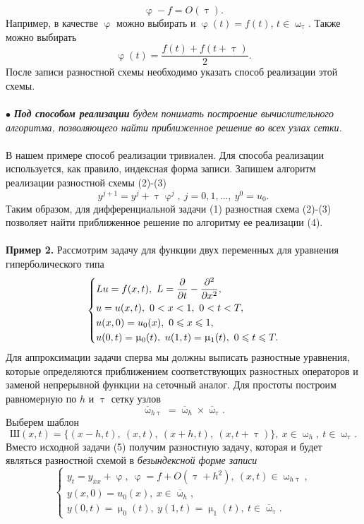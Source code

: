 \documentclass[a4paper, 12pt]{report}
\numberwithin{equation}{section}
\newcommand{\ol}{\overline}
\renewcommand{\leq}{\leqslant}
\renewcommand{\varphi}{\upvarphi}
\renewcommand{\tau}{\uptau}
\renewcommand{\mu}{\upmu}
\renewcommand{\omega}{\upomega}
\renewcommand{\d}{\partial}
\begin{document}
$$\varphi - f = O(\tau).$$
Например, в качестве $\varphi$ можно выбирать и $\varphi(t) = f(t)$, $t \in \omega_{\tau}$. Также можно выбирать $$\varphi(t) = \dfrac{f(t) + f(t+\tau)}{2}.$$
После записи разностной схемы необходимо указать способ реализации этой схемы.\\\\ $\bullet$ \textit{\textbf{Под способом реализации} будем понимать построение вычислительного алгоритма, позволяющего найти приближенное решение во всех узлах сетки.}\\\\
В нашем примере способ реализации тривиален. Для способа реализации используется, как правило, индексная форма записи. Запишем алгоритм реализации разностной схемы (2)-(3)
\begin{equation}
	y^{j+1}=y^j + \tau \varphi^j,\ j=0,1,\ldots,\ y^0 = u_0.
\end{equation}
Таким образом, для дифференциальной задачи (1) разностная схема (2)-(3) позволяет найти приближенное решение по алгоритму ее реализации (4).
\\\\
\textbf{Пример 2.}
Рассмотрим задачу для функции двух переменных для уравнения гиперболического типа
\begin{equation}
	\begin{dcases}
		Lu = f(x,t), \ L = \dfrac{\d }{\d t} - \dfrac{\d ^2}{\d x^2},\\
	u = u(x,t),\ 0<x<1,\ 0<t<T,\\
	u(x,0) = u_0(x), \ 0\leq x \leq 1,\\
	u(0,t) = \mu_0(t),\ u(1,t) = \mu_1(t),\ 0\leq t\leq T.
	\end{dcases}
\end{equation}
Для аппроксимации задачи сперва мы должны выписать разностные уравнения, которые определяются приближением соответствующих разностных операторов и заменой непрерывной функции на сеточный аналог. Для простоты построим равномерную по $h$ и $\tau$ сетку узлов
$$\ol \omega_{h\tau} = \ol \omega_h \times \ol \omega_\tau.$$
Выберем шаблон
$$\text{Ш}(x,t) = \{(x-h, t),\ (x,t),\ (x+h,t),\ (x,t+\tau)\},\ x\in \omega_h,\ t \in \omega_\tau.$$
Вместо исходной задачи (5) получим разностную задачу, которая и будет являться разностной схемой в \textit{безындексной форме записи}
\begin{equation}
	\begin{cases}
		y_t = y_{\ol x x} + \varphi,\ \varphi = f+O(\tau + h^2),\ (x,t)\in \omega_{h\tau},\\
	y(x,0) = u_0(x),\ x\in \ol \omega_h,\\
	y(0, t) = \mu_0(t),\ y(1,t) = \mu_1(t),\ t\in \ol\omega_\tau.
	\end{cases}
\end{equation}
\end{document}
